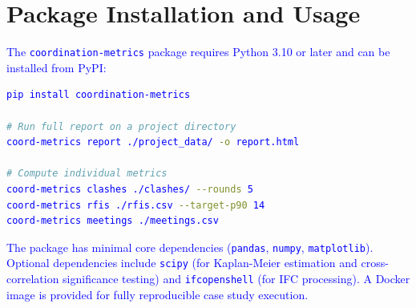 \documentclass[conference]{IEEEtran}
\newcommand{\placeholder}[1]{\textcolor{blue}{#1}}
\begin{document}
\section{Package Installation and Usage}
\placeholder{
The \texttt{coordination-metrics} package requires Python 3.10 or later and can be installed from PyPI:

\begin{lstlisting}[language=bash, basicstyle=\small\ttfamily]
pip install coordination-metrics

# Run full report on a project directory
coord-metrics report ./project_data/ -o report.html

# Compute individual metrics
coord-metrics clashes ./clashes/ --rounds 5
coord-metrics rfis ./rfis.csv --target-p90 14
coord-metrics meetings ./meetings.csv
\end{lstlisting}

The package has minimal core dependencies (\texttt{pandas}, \texttt{numpy}, \texttt{matplotlib}). Optional dependencies include \texttt{scipy} (for Kaplan-Meier estimation and cross-correlation significance testing) and \texttt{ifcopenshell} (for IFC processing). A Docker image is provided for fully reproducible case study execution.
}
\end{document}

